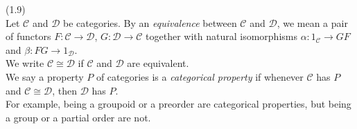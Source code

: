 \documentclass[a4paper]{article}
\begin{document}
\begin{defi} (1.9)\\
    Let $\mathcal{C}$ and $\mathcal{D}$ be categories. By an \emph{equivalence} between $\mathcal{C}$ and $\mathcal{D}$, we mean a pair of functors $F:\mathcal{C} \to \mathcal{D}$, $G:\mathcal{D} \to \mathcal{C}$ together with natural isomorphisms $\alpha: 1_\mathcal{C} \to GF$ and $\beta: FG \to 1_\mathcal{D}$.\\
    We write $\mathcal{C} \cong \mathcal{D}$ if $\mathcal{C}$ and $\mathcal{D}$ are equivalent.\\
    We say a property $P$ of categories is a \emph{categorical property} if whenever $\mathcal{C}$ has $P$ and $\mathcal{C} \cong \mathcal{D}$, then $\mathcal{D}$ has $P$.\\
    For example, being a groupoid or a preorder are categorical properties, but being a group or a partial order are not.
\end{defi}
\end{document}
